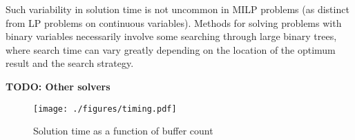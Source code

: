 Such variability in solution time is not uncommon in MILP problems (as distinct
from LP problems on continuous variables).
Methods for solving problems with binary variables necessarily involve some
searching through large binary trees, where search time can vary greatly
depending on the location of the optimum result and the search strategy.

\textbf{TODO: Other solvers}

\begin{figure}
    \label{fig.timing}
    \centering
    \texttt{[image: ./figures/timing.pdf]}
    \caption{Solution time as a function of buffer count}
\end{figure}

